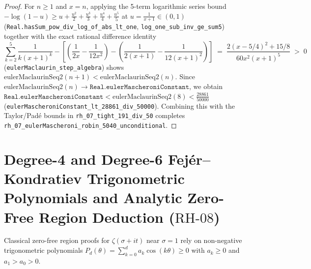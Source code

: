 \documentclass[11pt,a4paper]{article}
\theoremstyle{plain}
\theoremstyle{definition}
\theoremstyle{remark}
\begin{document}
\begin{proof}
For $n \ge 1$ and $x = n$, applying the 5-term logarithmic series bound $-\log(1 - u) \ge u + \frac{u^2}{2} + \frac{u^3}{3} + \frac{u^4}{4} + \frac{u^5}{5}$ at $u = \frac{1}{x+1} \in (0, 1)$ (\texttt{Real.hasSum\_pow\_div\_log\_of\_abs\_lt\_one}, \texttt{log\_one\_sub\_inv\_ge\_sum5}) together with the exact rational difference identity
\[
  \sum_{k=2}^{5} \frac{1}{k(x+1)^k} - \left[\left(\frac{1}{2x} - \frac{1}{12x^2}\right) - \left(\frac{1}{2(x+1)} - \frac{1}{12(x+1)^2}\right)\right] \;=\; \frac{2(x - 5/4)^2 + 15/8}{60 x^2 (x+1)^5} \;>\; 0
\]
(\texttt{eulerMaclaurin\_step\_algebra}) shows $\mathrm{eulerMaclaurinSeq2}(n+1) < \mathrm{eulerMaclaurinSeq2}(n)$. Since $\mathrm{eulerMaclaurinSeq2}(n) \to \texttt{Real.eulerMascheroniConstant}$, we obtain $\texttt{Real.eulerMascheroniConstant} < \mathrm{eulerMaclaurinSeq2}(8) < \frac{28861}{50000}$ (\texttt{eulerMascheroniConstant\_lt\_28861\_div\_50000}). Combining this with the Taylor/Pad\'e bounds in \texttt{rh\_07\_tight\_191\_div\_50} completes \texttt{rh\_07\_eulerMascheroni\_robin\_5040\_unconditional}.
\end{proof}

\section{Degree-4 and Degree-6 Fej\'er--Kondratiev Trigonometric Polynomials and Analytic Zero-Free Region Deduction (\texorpdfstring{$\mathrm{RH\text{-}08}$}{RH-08})}\label{sec:rh08}

Classical zero-free region proofs for $\zeta(\sigma + it)$ near $\sigma = 1$ rely on non-negative trigonometric polynomials $P_d(\theta) = \sum_{k=0}^{d} a_k \cos(k\theta) \ge 0$ with $a_k \ge 0$ and $a_1 > a_0 > 0$.
\end{document}
